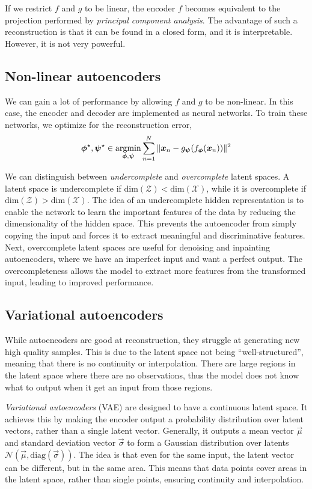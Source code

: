 If we restrict $f$ and $g$ to be linear, the encoder $f$ becomes equivalent to the projection
performed by \textit{principal component analysis}. The advantage of such a reconstruction is that
it can be found in a closed form, and it is interpretable. However, it is not very powerful.

\subsection{Non-linear autoencoders}

We can gain a lot of performance by allowing $f$ and $g$ to be non-linear. In this case, the
encoder and decoder are implemented as neural networks. To train these networks, we optimize for
the reconstruction error, \[
    \bm{\phi}^\star, \bm{\psi}^\star \in \operatorname*{argmin}_{\bm{\phi}, \bm{\psi}} \sum_{n=1}^{N} \| \bm{x}_n - g_{\bm{\psi}} (f_{\bm{\phi}}(\bm{x}_n)) \|^2
\]

We can distinguish between \textit{undercomplete} and \textit{overcomplete} latent spaces. A latent
space is undercomplete if $\mathrm{dim}(\mathcal{Z}) < \mathrm{dim}(\mathcal{X})$, while it is
overcomplete if $\mathrm{dim}(\mathcal{Z}) > \mathrm{dim}(\mathcal{X})$. The idea of an
undercomplete hidden representation is to enable the network to learn the important features of the
data by reducing the dimensionality of the hidden space. This prevents the autoencoder from simply
copying the input and forces it to extract meaningful and discriminative features. Next,
overcomplete latent spaces are useful for denoising and inpainting autoencoders, where we have an
imperfect input and want a perfect output. The overcompleteness allows the model to extract more
features from the transformed input, leading to improved performance.

\subsection{Variational autoencoders}

While autoencoders are good at reconstruction, they struggle at generating new high quality
samples. This is due to the latent space not being ``well-structured'', meaning that there is no
continuity or interpolation. There are large regions in the latent space where there are no
observations, thus the model does not know what to output when it get an input from those regions.

\textit{Variational autoencoders} (VAE) \citep{kingma2013auto} are designed to have a continuous
latent space. It achieves this by making the encoder output a probability distribution over latent
vectors, rather than a single latent vector. Generally, it outputs a mean vector $\vec{\mu}$ and
standard deviation vector $\vec{\sigma}$ to form a Gaussian distribution over latents
$\mathcal{N}(\vec{\mu}, \mathrm{diag}(\vec{\sigma}))$. The idea is that even for the same input, the
latent vector can be different, but in the same area. This means that data points cover areas in the
latent space, rather than single points, ensuring continuity and interpolation.

